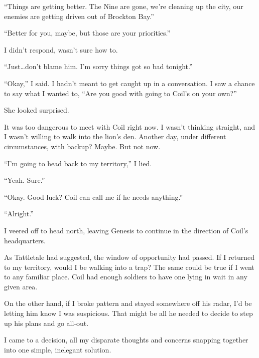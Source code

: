 ``Things are getting better.  The Nine are gone, we're cleaning up the city, our enemies are getting driven out of Brockton Bay.''



``Better for you, maybe, but those are your priorities.''



I didn't respond, wasn't sure how to.



``Just\ldots don't blame him.  I'm sorry things got so bad tonight.''



``Okay,'' I said.  I hadn't meant to get caught up in a conversation.  I saw a chance to say what I wanted to, ``Are you good with going to Coil's on your own?''



She looked surprised.



It was too dangerous to meet with Coil right now.  I wasn't thinking straight, and I wasn't willing to walk into the lion's den.  Another day, under different circumstances, with backup?  Maybe.  But not now.



``I'm going to head back to my territory,'' I lied.



``Yeah.  Sure.''



``Okay.  Good luck?  Coil can call me if he needs anything.''



``Alright.''



I veered off to head north, leaving Genesis to continue in the direction of Coil's headquarters.



As Tattletale had suggested, the window of opportunity had passed.  If I returned to my territory, would I be walking into a trap?  The same could be true if I went to any familiar place.  Coil had enough soldiers to have one lying in wait in any given area.



On the other hand, if I broke pattern and stayed somewhere off his radar, I'd be letting him know I was suspicious.  That might be all he needed to decide to step up his plans and go all-out.



I came to a decision, all my disparate thoughts and concerns snapping together into one simple, inelegant solution.



